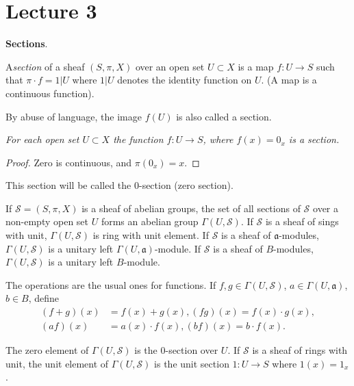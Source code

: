 \chapter{Lecture 3}

\noindent
\textbf{Sections}.

\begin{defi*}
A\pageoriginale \textit{section} of a sheaf $(S, \pi , X)$ over an open set $U
\subset X$ is a map $f: U \to S$ such that $\pi \cdot f=1|U$  where 
$1|U$ denotes the identity function on $U$. (A map is a continuous
function). 
\end{defi*}

By abuse of language, the image $f(U)$ is also called a section.

\textit{For each open set $U \subset X$ the function $f: U \to S$,
  where $f(x)=0_x$ is a section.} 

\begin{proof}
Zero is continuous, and $\pi(0_x)=x$.
\end{proof}

\noindent
This section will be called the 0-section (zero section).

\begin{proposition}%
 If $\mathscr{S}=(S, \pi , X)$ is a sheaf of abelian groups, the
  set of all sections of $\mathscr{S}$ over a non-empty open set $U$
  forms an abelian group $\Gamma(U,\mathscr{S})$. If $\mathscr{S}$ is a
  sheaf of sings with unit, $\Gamma(U,\mathscr{S})$ is ring with unit
  element. If $\mathscr{S}$ is a sheaf of $\mathfrak{a}$-modules,
  $\Gamma(U,\mathscr{S})$ is a unitary left $\Gamma(U,
  \mathfrak{a})$-module. If $\mathscr{S}$ is a sheaf of $B$-modules,
  $\Gamma(U,\mathscr{S})$ is a unitary left $B$-module.  
\end{proposition}

\begin{note*}
The operations are the usual ones for functions. If
$f,g \in \Gamma(U,\mathscr{S})$, $a \in \Gamma(U, \mathfrak{a})$, $b
\in B$, define   
\begin{align*}
(f+g) (x) & =f(x)+g(x), (fg) (x)  = f(x) \cdot g(x),\\
(af)(x) & = a(x) \cdot f(x), (bf) (x)  = b \cdot f(x) .
\end{align*}
\end{note*}

\noindent
The zero element of $\Gamma(U,\mathscr{S})$  is the 0-section over
$U$. If $\mathscr{S}$ is a sheaf of rings with unit, the unit element
of $\Gamma(U,\mathscr{S})$ is the unit section $1: U \to S$ where
$1(x) = 1_x$. 

